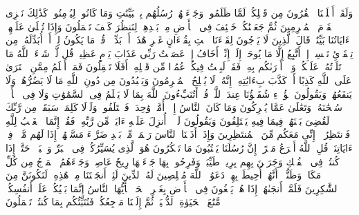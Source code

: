 \stopbuffer%
\startbuffer[\q:10:13]
وَلَقَدۡ أَهۡلَكۡنَا ٱلۡقُرُونَ مِن قَبۡلِكُمۡ لَمَّا ظَلَمُوا۟ وَجَاۤءَتۡهُمۡ رُسُلُهُم بِٱلۡبَیِّنَٰتِ وَمَا كَانُوا۟ لِیُؤۡمِنُوا۟ۚ كَذَٰلِكَ نَجۡزِی ٱلۡقَوۡمَ ٱلۡمُجۡرِمِینَ%
\stopbuffer%
\startbuffer[\q:10:14]
ثُمَّ جَعَلۡنَٰكُمۡ خَلَٰۤئِفَ فِی ٱلۡأَرۡضِ مِنۢ بَعۡدِهِمۡ لِنَنظُرَ كَیۡفَ تَعۡمَلُونَ%
\stopbuffer%
\startbuffer[\q:10:15]
وَإِذَا تُتۡلَىٰ عَلَیۡهِمۡ ءَایَاتُنَا بَیِّنَٰتࣲ قَالَ ٱلَّذِینَ لَا یَرۡجُونَ لِقَاۤءَنَا ٱئۡتِ بِقُرۡءَانٍ غَیۡرِ هَٰذَاۤ أَوۡ بَدِّلۡهُۚ قُلۡ مَا یَكُونُ لِیۤ أَنۡ أُبَدِّلَهُۥ مِن تِلۡقَاۤئِ نَفۡسِیۤۖ إِنۡ أَتَّبِعُ إِلَّا مَا یُوحَىٰۤ إِلَیَّۖ إِنِّیۤ أَخَافُ إِنۡ عَصَیۡتُ رَبِّی عَذَابَ یَوۡمٍ عَظِیمࣲ%
\stopbuffer%
\startbuffer[\q:10:16]
قُل لَّوۡ شَاۤءَ ٱللَّهُ مَا تَلَوۡتُهُۥ عَلَیۡكُمۡ وَلَاۤ أَدۡرَىٰكُم بِهِۦۖ فَقَدۡ لَبِثۡتُ فِیكُمۡ عُمُرࣰا مِّن قَبۡلِهِۦۤۚ أَفَلَا تَعۡقِلُونَ%
\stopbuffer%
\startbuffer[\q:10:17]
فَمَنۡ أَظۡلَمُ مِمَّنِ ٱفۡتَرَىٰ عَلَى ٱللَّهِ كَذِبًا أَوۡ كَذَّبَ بِءَایَٰتِهِۦۤۚ إِنَّهُۥ لَا یُفۡلِحُ ٱلۡمُجۡرِمُونَ%
\stopbuffer%
\startbuffer[\q:10:18]
وَیَعۡبُدُونَ مِن دُونِ ٱللَّهِ مَا لَا یَضُرُّهُمۡ وَلَا یَنفَعُهُمۡ وَیَقُولُونَ هَٰۤؤُلَاۤءِ شُفَعَٰۤؤُنَا عِندَ ٱللَّهِۚ قُلۡ أَتُنَبِّءُونَ ٱللَّهَ بِمَا لَا یَعۡلَمُ فِی ٱلسَّمَٰوَٰتِ وَلَا فِی ٱلۡأَرۡضِۚ سُبۡحَٰنَهُۥ وَتَعَٰلَىٰ عَمَّا یُشۡرِكُونَ%
\stopbuffer%
\startbuffer[\q:10:19]
وَمَا كَانَ ٱلنَّاسُ إِلَّاۤ أُمَّةࣰ وَٰحِدَةࣰ فَٱخۡتَلَفُوا۟ۚ وَلَوۡلَا كَلِمَةࣱ سَبَقَتۡ مِن رَّبِّكَ لَقُضِیَ بَیۡنَهُمۡ فِیمَا فِیهِ یَخۡتَلِفُونَ%
\stopbuffer%
\startbuffer[\q:10:20]
وَیَقُولُونَ لَوۡلَاۤ أُنزِلَ عَلَیۡهِ ءَایَةࣱ مِّن رَّبِّهِۦۖ فَقُلۡ إِنَّمَا ٱلۡغَیۡبُ لِلَّهِ فَٱنتَظِرُوۤا۟ إِنِّی مَعَكُم مِّنَ ٱلۡمُنتَظِرِینَ%
\stopbuffer%
\startbuffer[\q:10:21]
وَإِذَاۤ أَذَقۡنَا ٱلنَّاسَ رَحۡمَةࣰ مِّنۢ بَعۡدِ ضَرَّاۤءَ مَسَّتۡهُمۡ إِذَا لَهُم مَّكۡرࣱ فِیۤ ءَایَاتِنَاۚ قُلِ ٱللَّهُ أَسۡرَعُ مَكۡرًاۚ إِنَّ رُسُلَنَا یَكۡتُبُونَ مَا تَمۡكُرُونَ%
\stopbuffer%
\startbuffer[\q:10:22]
هُوَ ٱلَّذِی یُسَیِّرُكُمۡ فِی ٱلۡبَرِّ وَٱلۡبَحۡرِۖ حَتَّىٰۤ إِذَا كُنتُمۡ فِی ٱلۡفُلۡكِ وَجَرَیۡنَ بِهِم بِرِیحࣲ طَیِّبَةࣲ وَفَرِحُوا۟ بِهَا جَاۤءَتۡهَا رِیحٌ عَاصِفࣱ وَجَاۤءَهُمُ ٱلۡمَوۡجُ مِن كُلِّ مَكَانࣲ وَظَنُّوۤا۟ أَنَّهُمۡ أُحِیطَ بِهِمۡ دَعَوُا۟ ٱللَّهَ مُخۡلِصِینَ لَهُ ٱلدِّینَ لَئِنۡ أَنجَیۡتَنَا مِنۡ هَٰذِهِۦ لَنَكُونَنَّ مِنَ ٱلشَّٰكِرِینَ%
\stopbuffer%
\startbuffer[\q:10:23]
فَلَمَّاۤ أَنجَىٰهُمۡ إِذَا هُمۡ یَبۡغُونَ فِی ٱلۡأَرۡضِ بِغَیۡرِ ٱلۡحَقِّۗ یَٰۤأَیُّهَا ٱلنَّاسُ إِنَّمَا بَغۡیُكُمۡ عَلَىٰۤ أَنفُسِكُمۖ مَّتَٰعَ ٱلۡحَیَوٰةِ ٱلدُّنۡیَاۖ ثُمَّ إِلَیۡنَا مَرۡجِعُكُمۡ فَنُنَبِّئُكُم بِمَا كُنتُمۡ تَعۡمَلُونَ%
\stopbuffer%
